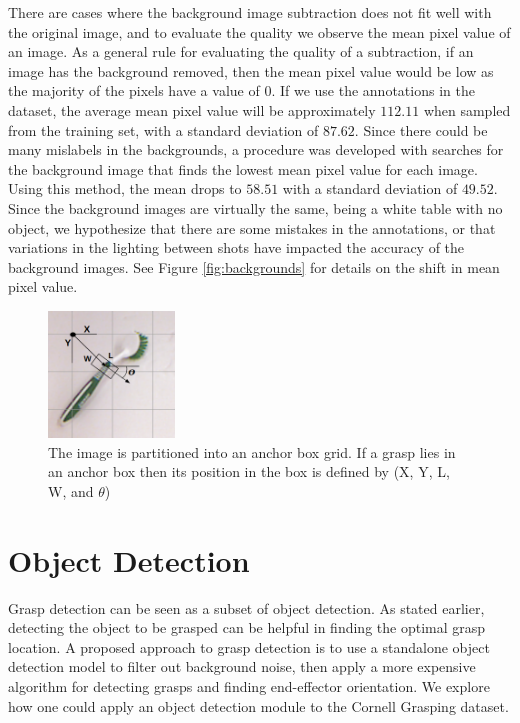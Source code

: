 \documentclass{article}
\begin{document}
There are cases where the background image subtraction does not fit well with the
original image, and to evaluate the quality we observe the mean pixel value of an
image. As a general rule for evaluating the quality of a subtraction, if an image
has the background removed, then the mean pixel value would be low as the
majority of the pixels have a value of $0$.
If we use the annotations in the dataset, the average
mean pixel value will be approximately $112.11$ when sampled from the training set,
with a standard deviation of $87.62$. Since there could be many mislabels in the
backgrounds, a procedure was developed with searches for the background image that
finds the lowest mean pixel value for each image. Using this method, the mean
drops to $58.51$ with a standard deviation of $49.52$. Since the background images are
virtually the same, being a white table with no object, we hypothesize that there
are some mistakes in the annotations, or that variations in the lighting between shots
have impacted the accuracy of the background images. See Figure \ref{fig:backgrounds} for
details on the shift in mean pixel value.

\begin{figure}
\centering
\includegraphics[width=0.3\textwidth]{figures/example_anchor_box.png}
\caption{The image is partitioned into an anchor box grid. If a grasp lies in an anchor box then its position in the box is defined by (X, Y, L, W, and $\theta$)}
\label{fig:example}
\end{figure}

\newpage
\section{Object Detection}
Grasp detection can be seen as a subset of object detection.
As stated earlier, detecting the object to be grasped can be helpful in finding the
optimal grasp location. A proposed approach to grasp detection is to use a standalone
object detection model to filter out background noise, then apply a more expensive
algorithm for detecting grasps and finding end-effector orientation. We explore how
one could apply an object detection module to the Cornell Grasping dataset.
\end{document}

